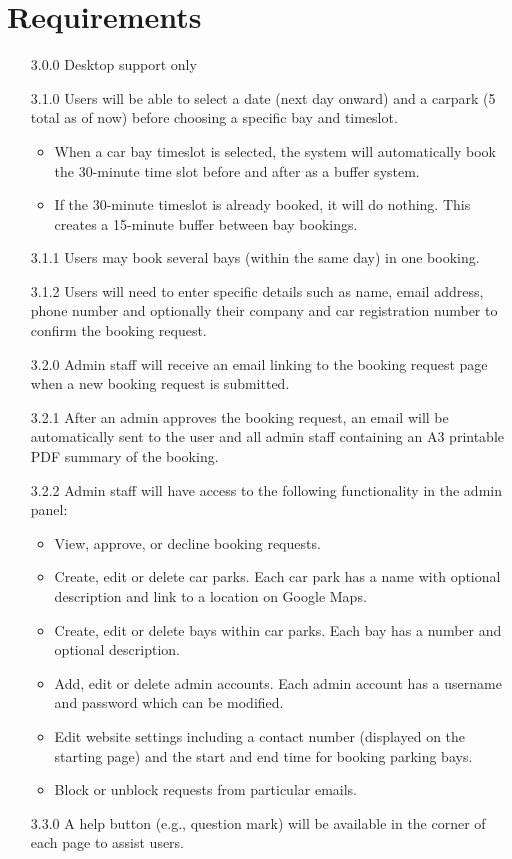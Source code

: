 \documentclass[a4paper, draft]{article}
\begin{document}
\section{Requirements}
\begin{itemize}
    \item [3.0.0] Desktop support only
    \item [3.1.0] Users will be able to select a date (next day onward) and a carpark
          (5 total as of now) before choosing a specific bay and timeslot.
          \begin{itemize}
              \item When a car bay timeslot is selected, the system will
                    automatically book the 30-minute time slot before and after
                    as a buffer system.
              \item If the 30-minute timeslot is already booked, it will do nothing.
                    This creates a 15-minute buffer between bay bookings.
          \end{itemize}
    \item [3.1.1] Users may book several bays (within the same day) in one booking.
    \item [3.1.2] Users will need to enter specific details such as name, email address,
          phone number and optionally their company and car registration number
          to confirm the booking request.
    \item [3.2.0] Admin staff will receive an email linking to the booking request page when
          a new booking request is submitted.
    \item [3.2.1] After an admin approves the booking request, an email will be automatically
          sent to the user and all admin staff containing an A3 printable PDF summary
          of the booking.
    \item [3.2.2] Admin staff will have access to the following functionality in the admin panel:
          \begin{itemize}
              \item View, approve, or decline booking requests.
              \item Create, edit or delete car parks.
                    Each car park has a name with optional description and link to a location on Google Maps.
              \item Create, edit or delete bays within car parks.
                    Each bay has a number and optional description.
              \item Add, edit or delete admin accounts.
                    Each admin account has a username and password which can be modified.
              \item Edit website settings including a contact number (displayed on the starting page)
                    and the start and end time for booking parking bays.
              \item Block or unblock requests from particular emails.
          \end{itemize}
    \item [3.3.0] A help button (e.g., question mark) will be available in the corner of each page to assist users.
\end{itemize}
\end{document}
